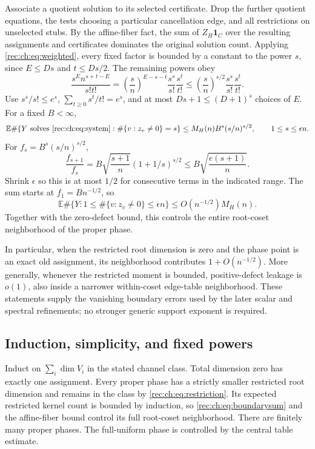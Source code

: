 \documentclass[11pt]{article}
\theoremstyle{definition}
\theoremstyle{remark}
\newcommand{\E}{\mathbb E}
\newcommand{\1}{\mathbf 1}
\providecommand{\one}{\mathbf 1}
\begin{document}
Associate a quotient solution to its selected certificate. Drop the further quotient equations, the tests choosing a particular cancellation edge, and all restrictions on unselected stubs. By the affine-fiber fact, the sum of $Z_H\one_C$ over the resulting assignments and certificates dominates the original solution count. Applying \eqref{rec:ch:eq:weighted}, every fixed factor is bounded by a constant to the power $s$, since $E\le Ds$ and $t\le Ds/2$. The remaining powers obey
\begin{equation}\label{rec:ch:eq:powers}
 \frac{s^E n^{s+t-E}}{s!t!}
 =\left(\frac{s}{n}\right)^{E-s-t}\frac{s^s}{s!}\frac{s^t}{t!}
 \le\left(\frac{s}{n}\right)^{s/2}\frac{s^s}{s!}\frac{s^t}{t!}.
\end{equation}
Use $s^s/s!\le e^s$, $\sum_{t\ge0}s^t/t!=e^s$, and at most $Ds+1\le(D+1)^s$ choices of $E$. For a fixed $B<\infty$,
\begin{equation}\label{rec:ch:eq:boundary}
 \E\#\{Y\text{ solves \eqref{rec:ch:eq:system}}:\#\{v:z_v\ne0\}=s\}
 \le M_H(n)B^s(s/n)^{s/2},\qquad1\le s\le\epsilon n.
\end{equation}
For $f_s=B^s(s/n)^{s/2}$,
\[
 \frac{f_{s+1}}{f_s}
 =B\sqrt{\frac{s+1}{n}}(1+1/s)^{s/2}
 \le B\sqrt{\frac{e(s+1)}n}.
\]
Shrink $\epsilon$ so this is at most $1/2$ for consecutive terms in the indicated range. The sum starts at $f_1=B n^{-1/2}$, so
\begin{equation}\label{rec:ch:eq:boundarysum}
 \E\#\{Y:1\le\#\{v:z_v\ne0\}\le\epsilon n\}
 \le O(n^{-1/2})M_H(n).
\end{equation}
Together with the zero-defect bound, this controls the entire root-coset neighborhood of the proper phase.

In particular, when the restricted root dimension is zero and the
phase point is an exact old assignment, its neighborhood contributes
$1+O(n^{-1/2})$. More generally, whenever the restricted moment is
bounded, positive-defect leakage is $o(1)$, also inside a narrower
within-coset edge-table neighborhood. These statements supply the
vanishing boundary errors used by the later scalar and spectral
refinements; no stronger generic support exponent is required.


\subsection{Induction, simplicity, and fixed powers}
Induct on $\sum_i\dim V_i$ in the stated channel class. Total dimension zero has exactly one assignment. Every proper phase has a strictly smaller restricted root dimension and remains in the class by \eqref{rec:ch:eq:restriction}. Its expected restricted kernel count is bounded by induction, so \eqref{rec:ch:eq:boundarysum} and the affine-fiber bound control its full root-coset neighborhood. There are finitely many proper phases. The full-uniform phase is controlled by the central table estimate.
\end{document}
